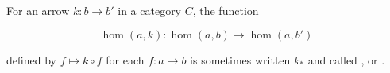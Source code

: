 For an arrow $k: b \to b'$ in a category $C$, the function

$$
\hom(a, k): \hom(a, b) \to \hom(a, b')
$$

defined by $f \mapsto k \circ f$ for each $f: a \to b$ is sometimes written $k_*$ and called , or .
